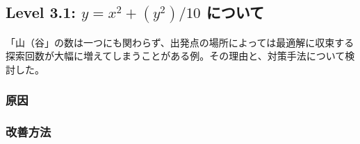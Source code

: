\subsection{Level 3.1: $y = x^2 + (y^2)/10$ について}
「山（谷」の数は一つにも関わらず、出発点の場所によっては最適解に収束する
探索回数が大幅に増えてしまうことがある例。その理由と、対策手法について検
討した。

\subsubsection{原因}
\subsubsection{改善方法}

